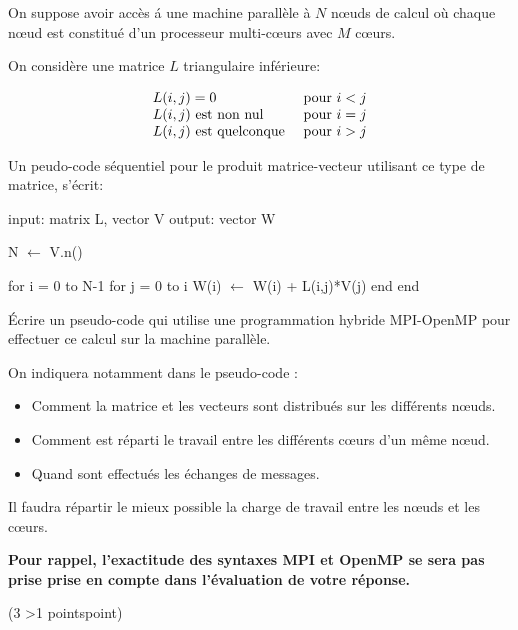 \documentclass[12pt]{report}
\newcounter{cptPoints}
\newcounter{cptQuestions}
\newcommand\question[2]{\bigskip\par\addtocounter{cptQuestions}{1}\addtocounter{cptPoints}{#2}{\bf Question #1 n\textsuperscript{o} \thecptQuestions} (#2 \ifnum #2>1 points\else point\fi)\par}
\begin{document}
On suppose avoir acc\`es \'a une machine parall\`ele \`a $N$ n\oe uds de calcul o\`u chaque n\oe ud est constitu\'e d'un processeur multi-c\oe urs avec $M$ c\oe urs.
\medskip

On considère une matrice $L$ triangulaire inf\'erieure:

$$
\begin{array}{ll}
L(i,j) = 0 & \hbox{pour } i < j \\
L(i,j) \hbox{ est non nul } & \hbox{pour } i = j \\
L(i,j) \hbox{ est quelconque } & \hbox{pour } i > j \\
\end{array}
$$

Un peudo-code séquentiel pour le produit matrice-vecteur utilisant ce type de matrice, s'écrit:
\begin{center}
\begin{minipage}{10cm}
\begin{algorithm}
input: matrix L, vector V
output: vector W
		
N $\gets$ V.n()
				
for i = 0 to N-1
   for j = 0 to i
      W(i) $\gets$ W(i) + L(i,j)*V(j)
   end
end       
\end{algorithm}
\end{minipage}
\end{center}

\'Ecrire un pseudo-code qui utilise une programmation hybride MPI-OpenMP pour effectuer ce calcul sur la machine parall\`ele. 

On indiquera notamment dans le pseudo-code :
\begin{itemize}
	\item Comment la matrice et les vecteurs sont distribu\'es sur les diff\'erents n\oe uds.
	\item Comment est r\'eparti le travail entre les diff\'erents c\oe urs d'un m\^eme n\oe ud.
	\item Quand sont effectu\'es les \'echanges de messages.
\end{itemize}

Il faudra r\'epartir le mieux possible la charge de travail entre les n\oe uds et les c\oe urs.

\medskip
{\bf Pour rappel, l'exactitude des syntaxes MPI et OpenMP se sera pas prise prise en compte dans l'\'evaluation de votre r\'eponse.}
 
\vfill\eject

\question{}3
\end{document}
